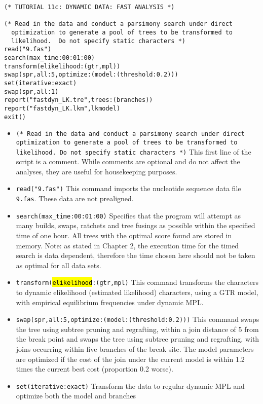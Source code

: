 \begin{verbatim}
(* TUTORIAL 11c: DYNAMIC DATA: FAST ANALYSIS *)

(* Read in the data and conduct a parsimony search under direct 
  optimization to generate a pool of trees to be transformed to 
  likelihood.  Do not specify static characters *)
read("9.fas")
search(max_time:00:01:00)
transform(elikelihood:(gtr,mpl))
swap(spr,all:5,optimize:(model:(threshold:0.2)))
set(iterative:exact)
swap(spr,all:1)
report("fastdyn_LK.tre",trees:(branches))
report("fastdyn_LK.lkm",lkmodel)
exit()
\end{verbatim}

\begin{itemize}
\item \texttt{(* Read in the data and conduct a parsimony search under direct optimization to generate a pool of trees 
to be transformed to likelihood.  Do not specify static characters *)} This first line of the script is a comment. While 
comments are optional and do not affect the analyses, they are useful for housekeeping purposes.
\item \texttt{read("9.fas")} This command imports the nucleotide sequence data file \texttt{9.fas}. These data are 
not prealigned.
\item \texttt{search(max\_time:00:01:00)} Specifies that the program will attempt as many builds, swaps, ratchets 
and tree fusings as possible within the specified time of one hour. All trees with the optimal score found are stored 
in memory.  Note: as stated in Chapter 2, the execution time for the timed search is data dependent, 
therefore the time chosen here should not be taken as optimal for all data sets.
\item \texttt{transform(\hl{elikelihood}:(gtr,mpl)} This command transforms the characters to dynamic elikelihood (estimated 
likelihood) characters, using a GTR model, with empirical equilibrium frequencies under dynamic MPL.
\item \texttt{swap(spr,all:5,optimize:(model:(threshold:0.2)))} This command swaps the tree using subtree pruning and
regrafting, within a join distance of 5 from the break point and swaps the tree using subtree pruning and regrafting, 
with joins occurring within five branches of the break site. The model parameters are optimized if the cost of the join 
under the current model is within 1.2 times the current best cost (proportion 0.2 worse).
\item \texttt{set(iterative:exact)} Transform the data to regular dynamic MPL and optimize both the model and branches

\end{itemize}
